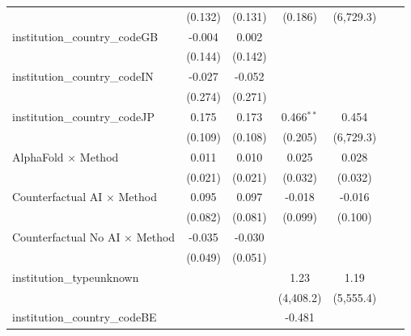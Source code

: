 \begin{tabular}{lcccccc}
                                         & (0.132)        & (0.131)        & (0.186)       & (6,729.3)     &     &   \\   
   institution\_country\_codeGB          & -0.004         & 0.002          &               &               &     &   \\   
                                         & (0.144)        & (0.142)        &               &               &     &   \\   
   institution\_country\_codeIN          & -0.027         & -0.052         &               &               &     &   \\   
                                         & (0.274)        & (0.271)        &               &               &     &   \\   
   institution\_country\_codeJP          & 0.175          & 0.173          & 0.466$^{**}$  & 0.454         &     &   \\   
                                         & (0.109)        & (0.108)        & (0.205)       & (6,729.3)     &     &   \\   
   AlphaFold $\times$ Method             & 0.011          & 0.010          & 0.025         & 0.028         &     &   \\   
                                         & (0.021)        & (0.021)        & (0.032)       & (0.032)       &     &   \\   
   Counterfactual AI $\times$ Method     & 0.095          & 0.097          & -0.018        & -0.016        &     &   \\   
                                         & (0.082)        & (0.081)        & (0.099)       & (0.100)       &     &   \\   
   Counterfactual No AI $\times$ Method  & -0.035         & -0.030         &               &               &     &   \\   
                                         & (0.049)        & (0.051)        &               &               &     &   \\   
   institution\_typeunknown              &                &                & 1.23          & 1.19          &     &   \\   
                                         &                &                & (4,408.2)     & (5,555.4)     &     &   \\   
   institution\_country\_codeBE          &                &                & -0.481        &               &     &   \\   

\end{tabular}
